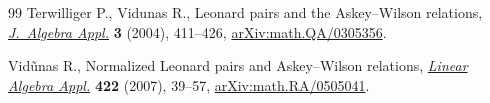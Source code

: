 \documentclass[10pt,a4paper]{amsart}
\numberwithin{equation}{section}
\begin{document}
\begin{thebibliography}{99}
Terwilliger P., Vidunas R., Leonard pairs and the {A}skey--{W}ilson relations,
 \href{https://doi.org/10.1142/S0219498804000940}{\textit{J.~Algebra Appl.}} \textbf{3} (2004), 411--426,
 \href{https://arxiv.org/abs/math.QA/0305356}{arXiv:math.QA/0305356}.

Vid\~unas R., Normalized {L}eonard pairs and {A}skey--{W}ilson relations,
 \href{https://doi.org/10.1016/j.laa.2005.12.033}{\textit{Linear Algebra Appl.}} \textbf{422} (2007), 39--57,
 \href{https://arxiv.org/abs/math.RA/0505041}{arXiv:math.RA/0505041}.

\end{thebibliography}
\end{document}
